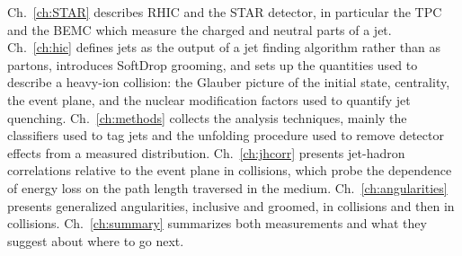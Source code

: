 Ch.~\ref{ch:STAR} describes RHIC and the STAR detector, in particular the TPC and the BEMC which measure the charged and neutral parts of a jet.
%
Ch.~\ref{ch:hic} defines jets as the output of a jet finding algorithm rather than as partons, introduces SoftDrop grooming, and sets up the quantities used to describe a heavy-ion collision: the Glauber picture of the initial state, centrality, the event plane, and the nuclear modification factors used to quantify jet quenching.
%
Ch.~\ref{ch:methods} collects the analysis techniques, mainly the classifiers used to tag jets and the unfolding procedure used to remove detector effects from a measured distribution.
%
Ch.~\ref{ch:jhcorr} presents jet-hadron correlations relative to the event plane in \AuAu collisions, which probe the dependence of energy loss on the path length traversed in the medium.
%
Ch.~\ref{ch:angularities} presents generalized angularities, inclusive and groomed, in \pp collisions and then in \AuAu collisions.
%
Ch.~\ref{ch:summary} summarizes both measurements and what they suggest about where to go next. 

%
%









